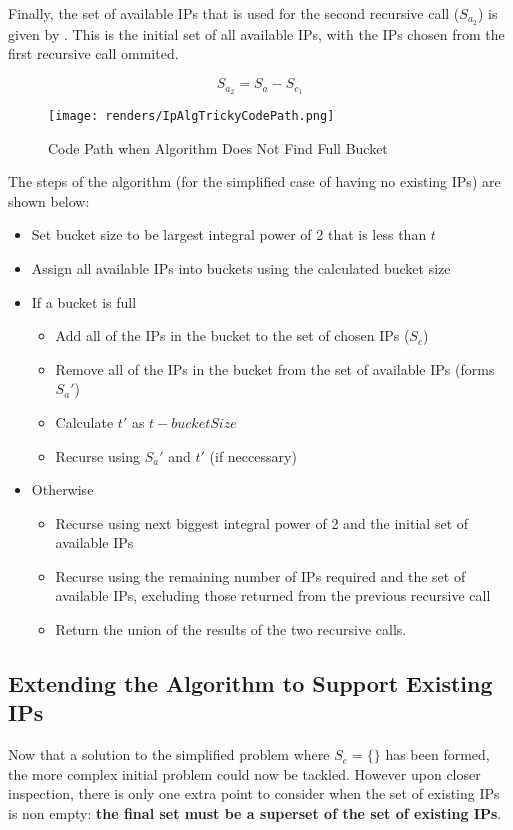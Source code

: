 Finally, the set of available IPs that is used for the second recursive call ($S_{a_2}$) is given by . This is the initial set of all available IPs, with the IPs chosen from the first recursive call ommited.

\begin{equation}\label{eq:availableIpsSecondRecurse}
S_{a_2} = S_a - S_{c_1}
\end{equation}

\begin{figure}[H]
      \centering
      \texttt{[image: renders/IpAlgTrickyCodePath.png]}
      \caption{Code Path when Algorithm Does Not Find Full Bucket}
      \label{fig:ipAlgTrickyCodePath}
\end{figure}

The steps of the algorithm (for the simplified case of having no existing IPs) are shown below:
\begin{itemize}
\item{Set bucket size to be largest integral power of 2 that is less than $t$}
\item{Assign all available IPs into buckets using the calculated bucket size}
\item{If a bucket is full}
  \begin{itemize}
  \item{Add all of the IPs in the bucket to the set of chosen IPs ($S_c$)}
  \item{Remove all of the IPs in the bucket from the set of available IPs (forms $S_a'$)}
  \item{Calculate $t'$ as $t - bucketSize$}
  \item{Recurse using $S_a'$ and $t'$ (if neccessary)}
  \end{itemize}
\item{Otherwise}
  \begin{itemize}
  \item{Recurse using next biggest integral power of 2 and the initial set of available IPs}
  \item{Recurse using the remaining number of IPs required and the set of available IPs, excluding those returned from the previous recursive call}
  \item{Return the union of the results of the two recursive calls.}
  \end{itemize}
\end{itemize}

\subsection{Extending the Algorithm to Support Existing IPs}
Now that a solution to the simplified problem where $S_e = \{\}$ has been formed, the more complex initial problem could now be tackled. However upon closer inspection, there is only one extra point to consider when the set of existing IPs is non empty: \textbf{the final set must be a superset of the set of existing IPs}. 

